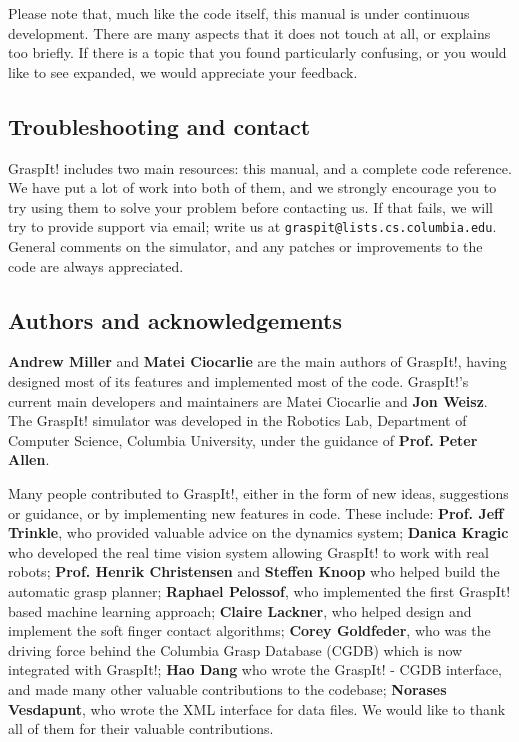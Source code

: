 Please note that, much like the code itself, this manual is under
continuous development. There are many aspects that it does not touch
at all, or explains too briefly. If there is a topic that you found
particularly confusing, or you would like to see expanded, we would
appreciate your feedback.

\subsection{Troubleshooting and contact}

GraspIt! includes two main resources: this manual, and a complete code
reference. We have put a lot of work into both of them, and we
strongly encourage you to try using them to solve your problem before
contacting us. If that fails, we will try to provide support via
email; write us at \texttt{graspit@lists.cs.columbia.edu}. General comments
on the simulator, and any patches or improvements to the code are
always appreciated.

\subsection{Authors and acknowledgements}

\textbf{Andrew Miller} and \textbf{Matei Ciocarlie} are the main
authors of GraspIt!, having designed most of its features and
implemented most of the code. GraspIt!'s current main developers and
maintainers are Matei Ciocarlie and \textbf{Jon Weisz}. The GraspIt!
simulator was developed in the Robotics Lab, Department of Computer
Science, Columbia University, under the guidance of
\textbf{Prof. Peter Allen}.

Many people contributed to GraspIt!, either in the form of new ideas,
suggestions or guidance, or by implementing new features in
code. These include: \textbf{Prof. Jeff Trinkle}, who provided
valuable advice on the dynamics system; \textbf{Danica Kragic} who
developed the real time vision system allowing GraspIt! to work with
real robots; \textbf{Prof. Henrik Christensen} and \textbf{Steffen
  Knoop} who helped build the automatic grasp planner; \textbf{Raphael
  Pelossof}, who implemented the first GraspIt! based machine learning
approach; \textbf{Claire Lackner}, who helped design and implement the
soft finger contact algorithms; \textbf{Corey Goldfeder}, who was the
driving force behind the Columbia Grasp Database (CGDB) which is now
integrated with GraspIt!; \textbf{Hao Dang} who wrote the GraspIt! -
CGDB interface, and made many other valuable contributions to the
codebase; \textbf{Norases Vesdapunt}, who wrote the XML interface for
data files. We would like to thank all of them for their valuable
contributions.

